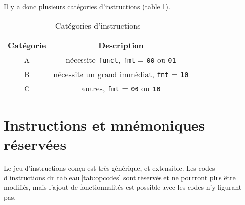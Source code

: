 Il y a donc plusieurs catégories d'instructions (table \ref{tab:instructions_types}).

\begin{table}[ht]
    \centering
    \begin{tabular}{cc}
    \toprule
    Catégorie & Description \\
    \midrule
    A & nécessite \texttt{funct}, \texttt{fmt} = \texttt{00} ou \texttt{01} \\
    B & nécessite un grand immédiat, \texttt{fmt} = \texttt{10} \\
    C & autres, \texttt{fmt} = \texttt{00} ou \texttt{10} \\
    \bottomrule
    \end{tabular}
    \caption{Catégories d'instructions}
    \label{tab:instructions_types}
\end{table}

\section{Instructions et mnémoniques réservées}

Le jeu d'instructions conçu est très générique, et extensible. Les codes
d'instructions du tableau \ref{tab:opcodes} sont réservés et ne pourront plus
être modifiés, mais l'ajout de fonctionnalités est possible avec les codes n'y
figurant pas.

